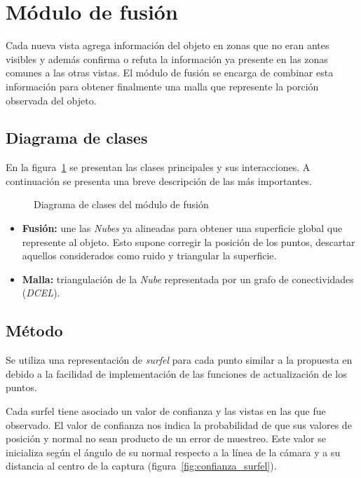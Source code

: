 \section{Módulo de fusión}
	Cada nueva vista agrega información del objeto en zonas que no eran antes visibles
	y además confirma o refuta la información ya presente en las zonas comunes a las otras vistas.
	El módulo de fusión se encarga de combinar esta información para obtener
	finalmente una malla que represente la porción observada del objeto.

	\subsection{Diagrama de clases}
		En la figura~\ref{fig:fusion_class} se presentan las clases principales y sus interacciones.
		A continuación se presenta una breve descripción de las más importantes.
		\begin{figure}
			\caption{\label{fig:fusion_class}Diagrama de clases del módulo de fusión}
		\end{figure}

		\begin{itemize}
			\item {\bfseries Fusión:} une las \emph{Nubes} ya alineadas para
				obtener una superficie global que represente al objeto.
				Esto supone corregir la posición de los puntos, descartar
				aquellos considerados como ruido y triangular la superficie.
			\item {\bfseries Malla:} triangulación de la \emph{Nube} representada por un grafo de conectividades (\emph{DCEL}).
		\end{itemize}


	\subsection{Método}
	Se utiliza una representación de \emph{surfel} para cada punto similar a la propuesta en \cite{5457479} %
	debido a la facilidad de implementación de las funciones de actualización de los puntos.

	Cada surfel tiene asociado un valor de confianza y las vistas en las que
	fue observado.  El valor de confianza nos indica la probabilidad de que sus
	valores de posición y normal no sean producto de un error de muestreo.
	Este valor se inicializa según el ángulo de su normal respecto a la línea
	de la cámara y a su distancia al centro de la captura (figura~\ref{fig:confianza_surfel}).


